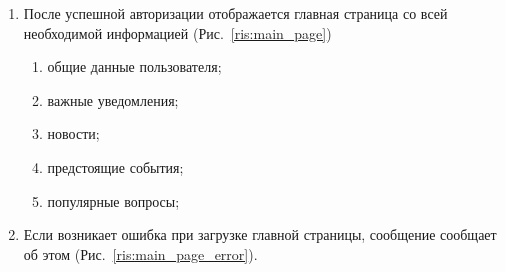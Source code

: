 \documentclass{../includes/TechDoc}
\begin{document}
\begin{enumerate}
        \item После успешной авторизации отображается главная страница со всей необходимой информацией (Рис.~\ref{ris:main_page})
        \begin{enumerate}
            \item общие данные пользователя;
            \item важные уведомления;
            \item новости;
            \item предстоящие события;
            \item популярные вопросы;
        \end{enumerate}

        \item Если возникает ошибка при загрузке главной страницы, сообщение сообщает об этом (Рис.~\ref{ris:main_page_error}).
        \begin{figure}[h]
            \begin{center}
                \begin{minipage}[h]{0.3\linewidth}

\end{minipage}
\end{center}
\end{figure}
\end{enumerate}
\end{document}
